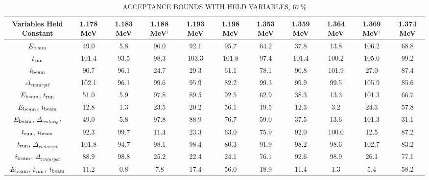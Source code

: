 \begin{landscape}
\begin{table}
    \begin{center}
        \caption{ACCEPTANCE BOUNDS WITH HELD VARIABLES, 67\,\%}
        \label{tab:acceptance-uncertainty-67}
        \begin{tabular}{cS[table-format=4.2]S[table-format=4.2]S[table-format=4.2]S[table-format=4.2]
        S[table-format=4.2]S[table-format=4.2]S[table-format=4.2]S[table-format=4.2]S[table-format=4.2]S[table-format=4.2]
        }
            \toprule
            \midrule
            \textbf{Variables Held Constant} &
                \textbf{1.178 MeV} & \textbf{1.183 MeV} & \textbf{1.188 MeV}$^\dagger$ & \textbf{1.193 MeV} & \textbf{1.198 MeV} &
                \textbf{1.353 MeV} & \textbf{1.359 MeV} & \textbf{1.364 MeV} & \textbf{1.369 MeV}$^\dagger$ & \textbf{1.374 MeV} \\
            \midrule
$E_{\rm beam}$
    &  49.0 &   5.8 &  96.0 &  92.1 &  95.7 &  64.2 &  37.8 &  13.8 & 106.2 &  68.8 \\
$t_{\rm run}$
    & 101.4 &  93.5 &  98.3 & 103.3 & 101.8 &  97.4 & 101.4 & 100.2 & 105.0 &  99.2 \\
$i_{\rm beam}$
    &  90.7 &  96.1 &  24.7 &  29.3 &  61.1 &  78.1 &  90.8 & 101.9 &  27.0 &  87.4 \\
$\Delta_{rm target}$
    & 102.1 &  96.1 &  99.6 &  95.9 &  82.2 &  99.3 &  99.9 &  99.5 & 105.9 &  85.6 \\
$E_{\rm beam}$, $t_{\rm run}$
    &  51.0 &   5.9 &  97.8 &  89.5 &  92.5 &  62.9 &  38.3 &  13.3 & 101.3 &  66.7 \\
$E_{\rm beam}$, $i_{\rm beam}$
    &  12.8 &   1.3 &  23.5 &  20.2 &  56.1 &  19.5 &  12.3 &   3.2 &  24.3 &  57.8 \\
$E_{\rm beam}$, $\Delta_{rm target}$
    &  49.0 &   5.8 &  97.8 &  88.9 &  76.7 &  59.0 &  37.5 &  13.6 & 101.3 &  31.1 \\
$t_{\rm run}$, $i_{\rm beam}$
    &  92.3 &  99.7 &  11.4 &  23.3 &  63.0 &  75.9 &  92.0 & 100.0 &  12.5 &  87.2 \\
$t_{\rm run}$, $\Delta_{rm target}$
    & 101.8 &  94.7 &  98.1 &  98.4 &  80.3 &  91.9 &  98.2 &  98.6 & 102.7 &  83.2 \\
$i_{\rm beam}$, $\Delta_{rm target}$
    &  88.9 &  98.8 &  25.2 &  22.4 &  24.1 &  76.1 &  92.6 &  98.9 &  26.1 &  77.1 \\
$E_{\rm beam}$, $t_{\rm run}$, $i_{\rm beam}$
    &  11.2 &   0.8 &   7.8 &  17.4 &  56.0 &  18.9 &  11.4 &   1.3 &   5.4 &  58.2 \\

\end{tabular}
\end{center}
\end{table}
\end{landscape}
